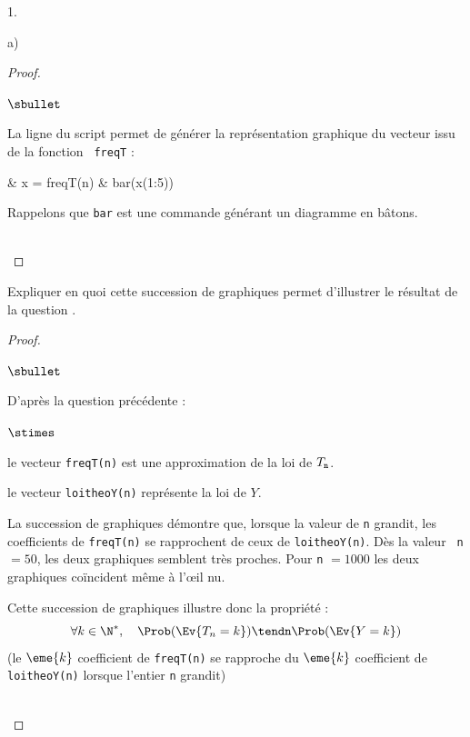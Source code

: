 \documentclass[11pt]{article}%
\begin{document}
\begin{noliste}{1.}
\begin{noliste}{a)}
\begin{proof}
\begin{noliste}{$\sbullet$}
      \item La ligne  du script permet de générer la
        représentation graphique du vecteur issu de la fonction {\tt
          freqT} :
        \begin{scilabC}{10}
          & x = freqT(n) \nl %
          & bar(x(1:5)) \nl %
        \end{scilabC}
        Rappelons que {\tt bar} est une commande générant un diagramme
        en bâtons.%
      \end{noliste}
      ~\\[-1.4cm]
    \end{proof}
    
    


  \item Expliquer en quoi cette succession de graphiques permet
    d'illustrer le résultat de la question .
  
    \begin{proof}~
      \begin{noliste}{$\sbullet$}
      \item D'après la question précédente :
        \begin{noliste}{$\stimes$}
        \item le vecteur {\tt freqT(n)} est une approximation de la
          loi de $T_{\tt n}$.
        \item le vecteur {\tt loitheoY(n)} représente la loi de $Y$.
        \end{noliste}

      \item La succession de graphiques démontre que, lorsque la valeur
        de {\tt n} grandit, les coefficients de {\tt freqT(n)} se
        rapprochent de ceux de {\tt loitheoY(n)}. Dès la valeur {\tt
          n} $= 50$, les deux graphiques semblent très proches. Pour
        {\tt n} $= 1000$ les deux graphiques coïncident même à
        l'\oe{}il nu.

      \item Cette succession de graphiques illustre donc la propriété :
        \[
        \forall k \in \N^*, \quad \Prob(\Ev{T_n = k}) \tendn
        \Prob(\Ev{Y = k})
        \]
        (le $\eme{k}$ coefficient de {\tt freqT(n)} se rapproche du
        $\eme{k}$ coefficient de {\tt loitheoY(n)} lorsque l'entier
        {\tt n} grandit)
      \end{noliste}
      ~\\[-1.4cm]
    \end{proof}    
  \end{noliste}
\end{noliste}
\end{document}

